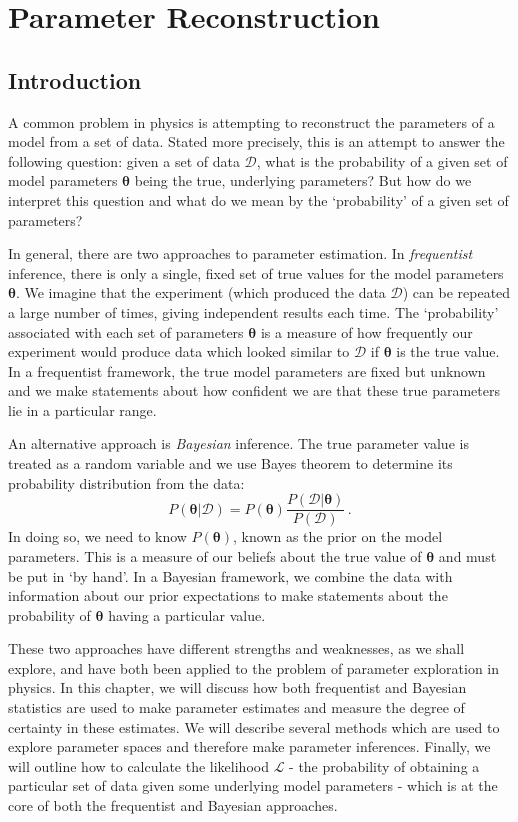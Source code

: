\chapter{Parameter Reconstruction}
\label{ch:parameter}

\section{Introduction}

A common problem in physics is attempting to reconstruct the parameters of a model from a set of data. Stated more precisely, this is an attempt to answer the following question: given a set of data $\mathcal{D}$, what is the probability of a given set of model parameters $\boldsymbol\theta$ being the true, underlying parameters? But how do we interpret this question and what do we mean by the `probability' of a given set of parameters?

In general, there are two approaches to parameter estimation. In \textit{frequentist} inference, there is only a single, fixed set of true values for the model parameters $\boldsymbol\theta$. We imagine that the experiment (which produced the data $\mathcal{D}$) can be repeated a large number of times, giving independent results each time. The `probability' associated with each set of parameters $\boldsymbol\theta$ is a measure of how frequently our experiment would produce data which looked similar to $\mathcal{D}$ if $\boldsymbol\theta$ is the true value. In a frequentist framework, the true model parameters are fixed but unknown and we make statements about how confident we are that these true parameters lie in a particular range.

An alternative approach is \textit{Bayesian} inference. The true parameter value is treated as a random variable and we use Bayes theorem to determine its probability distribution from the data:
\begin{equation}
P(\boldsymbol\theta|\mathcal{D}) = P(\boldsymbol\theta) \frac{P(\mathcal{D}|\boldsymbol\theta)}{P(\mathcal{D})}\,.
\end{equation}
In doing so, we need to know $P(\boldsymbol\theta)$, known as the prior on the model parameters. This is a measure of our beliefs about the true value of $\boldsymbol\theta$ and must be put in `by hand'. In a Bayesian framework, we combine the data with information about our prior expectations to make statements about the probability of $\boldsymbol\theta$ having a particular value.

These two approaches have different strengths and weaknesses, as we shall explore, and have both been applied to the problem of parameter exploration in physics. In this chapter, we will discuss how both frequentist and Bayesian statistics are used to make parameter estimates and measure the degree of certainty in these estimates. We will describe several methods which are used to explore parameter spaces and therefore make parameter inferences. Finally, we will outline how to calculate the likelihood $\mathcal{L}$ - the probability of obtaining a particular set of data given some underlying model parameters - which is at the core of both the frequentist and Bayesian approaches.

